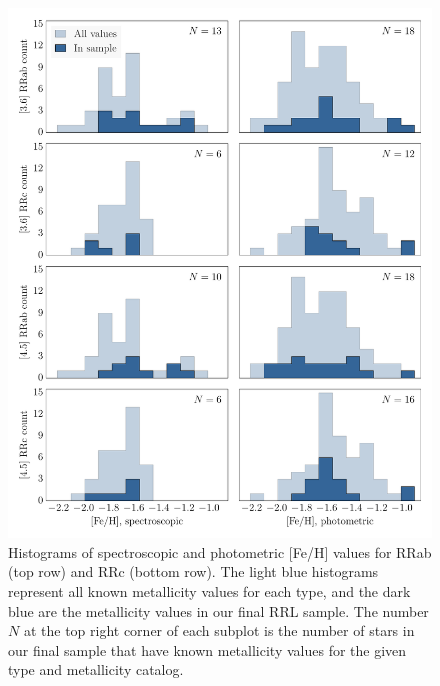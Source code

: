 \documentclass[a4paper,fleqn,usenatbib]{mnras}
\begin{document}
\begin{figure}
\begin{center}
\includegraphics[width=160mm]{reworked_fitting_code/final_plots/metallicity_hists.pdf}
\caption{Histograms of spectroscopic \citep[right column]{2006ApJ...640L..43S} and photometric \citep[left column]{2000AJ....119.1824R} [Fe/H] values for RRab (top row) and RRc (bottom row). The light blue histograms represent all known metallicity values for each type, and the dark blue are the metallicity values in our final RRL sample. The number $N$ at the top right corner of each subplot is the number of stars in our final sample that have known metallicity values for the given type and metallicity catalog.}
\label{fig:metallicity_hists}
\end{center}
\end{figure}
\end{document}
